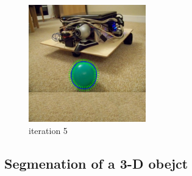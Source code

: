 \begin{figure}
\begin{minipage}[t]{0.45\linewidth}
    \label{fig:side:c} 
  \end{minipage} 
  \begin{minipage}[t]{0.45\linewidth} 
    \centering 
    \includegraphics[width=2.0in]{images/ball_normal/4.png} 
    \caption{iteration 5} 
    \label{fig:side:d} 
  \end{minipage} 
\end{figure}



\subsection{Segmenation of a 3-D obejct}
\label{sec:s3o}

